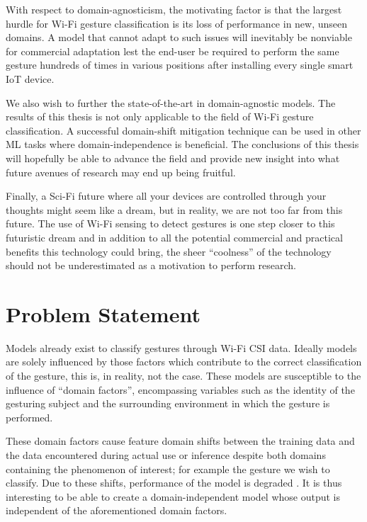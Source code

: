 With respect to domain-agnosticism, the motivating factor is that the largest hurdle for Wi-Fi gesture classification is its loss of performance in new, unseen domains.
A model that cannot adapt to such issues will inevitably be nonviable for commercial adaptation lest the end-user be required to perform the same gesture hundreds of times in various positions after installing every single smart IoT device.

We also wish to further the state-of-the-art in domain-agnostic models.
The results of this thesis is not only applicable to the field of Wi-Fi gesture classification.
A successful domain-shift mitigation technique can be used in other ML tasks where domain-independence is beneficial.
The conclusions of this thesis will hopefully be able to advance the field and provide new insight into what future avenues of research may end up being fruitful.

Finally, a Sci-Fi future where all your devices are controlled through your thoughts might seem like a dream, but in reality, we are not too far from this future.
The use of Wi-Fi sensing to detect gestures is one step closer to this futuristic dream and in addition to all the potential commercial and practical benefits this technology could bring, the sheer ``coolness'' of the technology should not be underestimated as a motivation to perform research.

\section{Problem Statement}\label{sec:intro-problem-statement}
Models already exist to classify gestures through Wi-Fi CSI data.
Ideally models are solely influenced by those factors which contribute to the correct classification of the gesture, this is, in reality, not the case.
These models are susceptible to the influence of ``domain factors'', encompassing variables such as the identity of the gesturing subject and the surrounding environment in which the gesture is performed.

These domain factors cause feature domain shifts between the training data and the data encountered during actual use or inference despite both domains containing the phenomenon of interest; for example the gesture we wish to classify.
Due to these shifts, performance of the model is degraded \cite{chetty2011through,adib2013see,pu2013whole,adib20143d,he2015wig,jiang2018towards,zheng2019zero,jiang2020wigan,ma2021location}.
It is thus interesting to be able to create a domain-independent model whose output is independent of the aforementioned domain factors.

